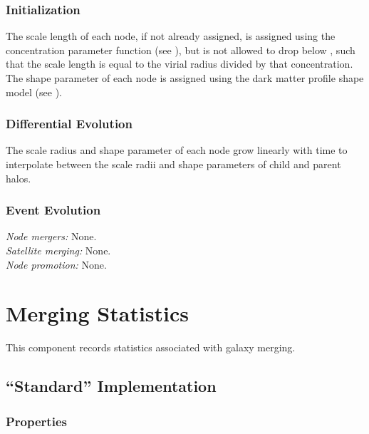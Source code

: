 \subsubsection{Initialization}

The scale length of each node, if not already assigned, is assigned using the concentration parameter function (see ), but is not allowed to drop below {\normalfont \ttfamily [darkMatterProfileMinimumConcentration]}, such that the scale length is equal to the virial radius divided by that concentration. The shape parameter of each \gls{node} is assigned using the dark matter profile shape model (see ).

\subsubsection{Differential Evolution}

The scale radius and shape parameter of each node grow linearly with time to interpolate between the scale radii and shape parameters of child and parent halos.

\subsubsection{Event Evolution}

\noindent\emph{Node mergers:} None.\\

\noindent\emph{Satellite merging:} None.\\

\noindent\emph{Node promotion:} None.\\


\section{Merging Statistics}

This \gls{component} records statistics associated with galaxy merging.

\subsection{``Standard'' Implementation}

\subsubsection{Properties}

